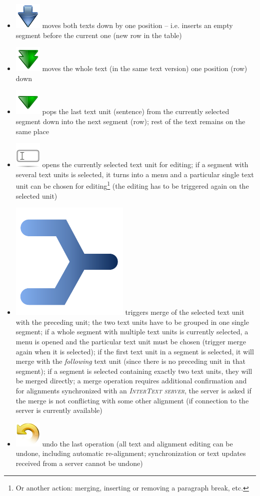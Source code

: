\documentclass[a4paper,10pt,oneside]{book}
\newcommand{\ITserver}{\textit{\textsc{InterText server}}\xspace}
\begin{document}
\begin{itemize}
	\item \includegraphics[height=2ex]{../images/48/go-down.png} moves both texts down by one position -- i.e. inserts an empty segment before the current one (new row in the table)
	\item \includegraphics[height=2ex]{../images/48/arrow-down-double.png} moves the whole text (in the same text version) one position (row) down
	\item \includegraphics[height=2ex]{../images/48/arrow-down.png} pops the last text unit (sentence) from the currently selected segment down into the next segment (row); rest of the text remains on the same place
	\item \includegraphics[height=2ex]{../images/48/edit-rename.png} opens the currently selected text unit for editing; if a segment with several text units is selected, it turns into a menu and a particular single text unit can be chosen for editing\footnote{Or another action: merging, inserting or removing a paragraph break, etc.} (the editing has to be triggered again on the selected unit)
	\item \includegraphics[height=2ex]{merge.pdf} triggers merge of the selected text unit with the preceding unit; the two text units have to be grouped in one single segment; if a whole segment with multiple text units is currently selected, a menu is opened and the particular text unit must be chosen (trigger merge again when it is selected); if the first text unit in a segment is selected, it will merge with the \emph{following} text unit (since there is no preceding unit in that segment); if a segment is selected containing exactly two text units, they will be merged directly; a merge operation requires additional confirmation and for alignments synchronized with an \ITserver, the server is asked if the merge is not conflicting with some other alignment (if connection to the server is currently available)
	\item \includegraphics[height=2ex]{../images/48/edit-undo.png} undo the last operation (all text and alignment editing can be undone, including automatic re-alignment; synchronization or text updates received from a server cannot be undone)

\end{itemize}
\end{document}
